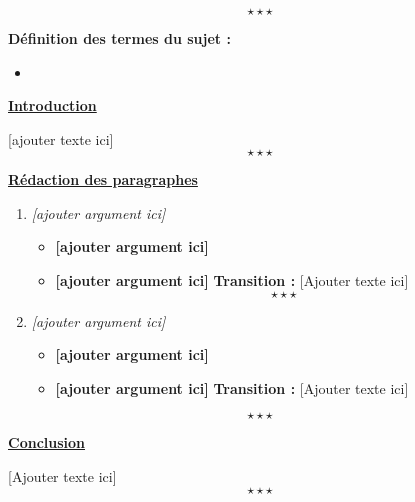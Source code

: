 \newpage \begin{center}
	\subsubsection*{}
\end{center}
$$\star \star \star$$


\noindent \textbf{Définition des termes du sujet :}

\begin{itemize}
	\item 
\end{itemize}

\begin{center}
	\textbf{\underline{Introduction}} 
\end{center}

[ajouter texte ici] $$\star \star \star$$

\begin{center}
	{\bfseries \underline{Rédaction des paragraphes}}	
\end{center}
\begin{enumerate}[label*=$\longrightarrow$]
	\item \textit{[ajouter argument ici]}
	\begin{itemize}
		\item \textbf{[ajouter argument ici]}
		\item \textbf{[ajouter argument ici]} \newline 
		\textbf{Transition :} [Ajouter texte ici] $$\star \star \star$$
	\end{itemize}
	\item \textit{[ajouter argument ici]}
	\begin{itemize}
		\item \textbf{[ajouter argument ici]}
		\item \textbf{[ajouter argument ici]} \newline 
		\textbf{Transition :} [Ajouter texte ici]
	\end{itemize}
\end{enumerate}
$$\star \star \star$$
\begin{center}
	\textbf{\underline{Conclusion}} 
\end{center} 

[Ajouter texte ici] $$\star \star \star$$
